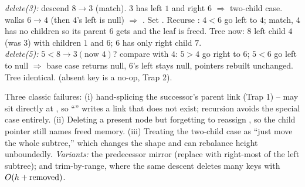 \begin{tracebox}
\emph{delete(3):} descend $8\to3$ (match). $3$ has left $1$ and right $6$ $\Rightarrow$ two-child case.
 walks $6\to4$ (then $4$'s left is null) $\Rightarrow$ . Set
. Recurse : $4<6$ go left to $4$; match, $4$ has no
children so its parent $6$ gets  and the leaf is freed. Tree now: $8$ left
child $4$(was $3$) with children $1$ and $6$; $6$ has only right child $7$. \checkmark\\
\emph{delete(5):} $5<8\to3(\text{now }4)$? compare with $4$: $5>4$ go right to $6$; $5<6$ go left to
null $\Rightarrow$ base case returns null, $6$'s left stays null, pointers rebuilt unchanged. Tree
identical. \checkmark (absent key is a no-op, Trap 2).
\end{tracebox}


\begin{warningbox}
Three classic failures: (i) hand-splicing the successor's parent link (Trap 1) --  may sit
directly at , so ``'' writes a link that does not
exist; recursion avoids the special case entirely. (ii) Deleting a present node but forgetting to
reassign , so the child pointer still names freed memory. (iii) Treating the
two-child case as ``just move the whole subtree,'' which changes the shape and can rebalance height
unboundedly. \emph{Variants:} the predecessor mirror (replace with right-most of the left subtree);
and trim-by-range, where the same descent deletes many keys with $O(h+\text{removed})$.
\end{warningbox}

